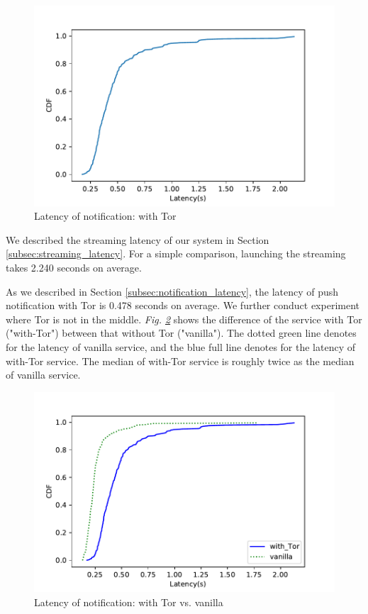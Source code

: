 \begin{figure}
	\includegraphics[width=\linewidth]{notification_latency_withTor.pdf}
	\caption{Latency of notification: with Tor}
	\label{fig:notificationlatency_wTor}
\end{figure}


We described the streaming latency of our system in Section \ref{subsec:streaming_latency}. For a simple comparison, launching the streaming takes 2.240 seconds on average.


As we described in Section \ref{subsec:notification_latency}, the latency of push notification with Tor is 0.478 seconds on average. We further conduct experiment where Tor is not in the middle. \textit{Fig. \ref{fig:notificationlatency_wTor_vs_vanilla}} shows the difference of the service with Tor ("with-Tor") between that without Tor ("vanilla"). The dotted green line denotes for the latency of vanilla service, and the blue full line denotes for the latency of with-Tor service. The median of with-Tor service is roughly twice as the median of vanilla service.

\begin{figure}
	\includegraphics[width=\linewidth]{plot_push_tor_vs_vanilla.pdf}
	\caption{Latency of notification: with Tor vs. vanilla}
	\label{fig:notificationlatency_wTor_vs_vanilla}
\end{figure}